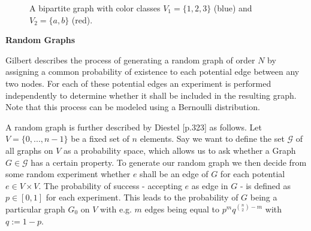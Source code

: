 \begin{figure}[h]
    \centering
    \caption[Example of a bipartite graph]{A bipartite graph with color classes $V_1 = \{1,2,3\}$ (blue) and $V_2=\{a,b\}$ (red).}
    \label{fig:bipartite-colored}
\end{figure}

\textbf{Random Graphs}
\label{sec:random-graphs}

Gilbert \cite{gilbert1959random} describes the process of generating a random graph of order $N$ by assigning a common probability of existence to each potential edge between any two nodes. For each of these potential edges an experiment is performed independently to determine whether it shall be included in the resulting graph. Note that this process can be modeled using a Bernoulli distribution.

A random graph is further described by Diestel \cite{Diestel2017}[p.323] as follows. Let $V = \{0,...,n-1\}$ be a fixed set of $n$ elements. Say we want to define the set $\mathcal{G}$ of all graphs on $V$ as a probability space, which allows us to ask whether a Graph $G \in \mathcal{G}$ has a certain property. To generate our random graph we then decide from some random experiment whether $e$ shall be an edge of $G$ for each potential $e \in V \times V$. The probability of success - accepting $e$ as edge in $G$ - is defined as $p \in [0,1]$ for each experiment. This leads to the probability of $G$ being a particular graph $G_0$ on $V$ with e.g. $m$ edges being equal to $p^m q^{\binom{n}{2}-m}$ with $q:=1-p$.
\bigskip

